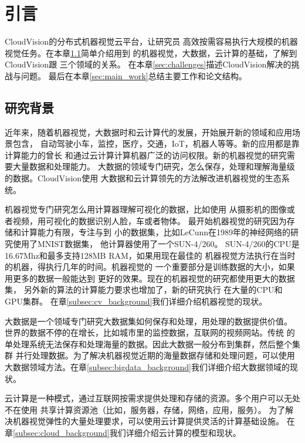 \chapter{引言}
\label{cha:intro}
CloudVision的分布式机器视觉云平台，让研究员
高效按需容易执行大规模的机器视觉任务。在本章\ref{sec:background}简单介绍用到
的机器视觉，大数据，云计算的基础，了解到CloudVision跟
三个领域的关系。
在本章\ref{sec:challenges}描述CloudVision解决的挑战与问题。
最后在本章\ref{sec:main_work}总结主要工作和论文结构。

\section{研究背景}
\label{sec:background}
近年来，随着机器视觉，大数据时和云计算代的发展，开始展开新的领域和应用场景包含，
自动驾驶小车，监控，医疗，交通，IoT，机器人等等。新的应用都是靠计算能力的曾长
和通过云计算计算机器广泛的访问权限。新的机器视觉的研究需要大量数据和处理能力。
大数据的领域专门研究，怎么保存，处理和理解海量级的数据。CloudVision使用
大数据和云计算领先的方法解改进机器视觉的生态系统。

机器视觉专门研究怎么用计算器理解可视化的数据，比如使用
从摄影机的图像或者视频，用可视化的数据识别人脸，车或者物体。
最开始机器视觉的研究因为存储和计算能力有限，专注与到
小的数据集，比如LeCunn在1989年的神经网络的研究使用了MNIST数据集，
他计算器使用了一个SUN-4/260。\cite{lecun1989backpropagation}
SUN-4/260的CPU是16.67Mhz和最多支持128MB RAM，如果用现在最佳的
机器视觉方法执行在当时的机器，得执行几年的时间。机器视觉的
一个重要部分是训练数据的大小，如果用更多的数据一般能达到
更好的效果。现在的机器视觉的研究都使用更大的数据集，
另外新的算法的计算能力要求也增加了，新的研究执行
在大量的CPU和GPU集群。\cite{googlenet2015,baidup2015deepgpu}
在章\ref{subsec:cv_background}我们详细介绍机器视觉的现状。

大数据是一个领域专门研究大数据集如何保存和处理，用处理的数据提供价值。
世界的数据不停的在增长，比如城市里的监控数据，互联网的视频网站。传统
的单处理系统无法保存和处理海量的数据。因此大数据一般分布到集群，然后整个集群
并行处理数据。为了解决机器视觉近期的海量数据存储和处理问题，可以使用
大数据领域方法。在章\ref{subsec:bigdata_background}我们详细介绍大数据领域的现状。

云计算是一种模式，通过互联网按需求提供处理和存储的资源。多个用户可以无处不在使用
共享计算资源池（比如，服务器，存储，网络，应用，服务）。
为了解决机器视觉弹性的大量处理要求，可以使用云计算提供灵活的计算基础设施。
在章\ref{subsec:cloud_background}我们详细介绍云计算的模型和现状。




